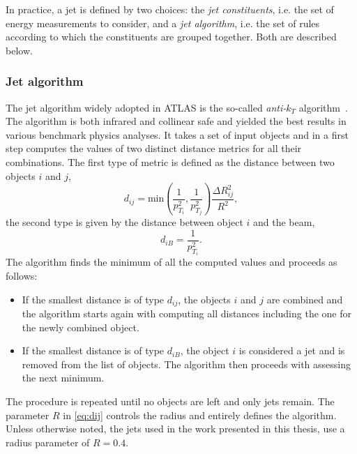 In practice, a jet is defined by two choices: the \emph{jet constituents}, i.e. the set of energy measurements to consider, and a \emph{jet algorithm}, i.e. the set of rules according to which the constituents are grouped together.
Both are described below.



\subsubsection{Jet algorithm}
The jet algorithm widely adopted in ATLAS is the so-called \emph{anti-$k_T$} algorithm~\cite{Cacciari:2008gp}. The algorithm is both infrared and collinear safe and yielded the best results in various benchmark physics analyses. 
It takes a set of input objects and in a first step computes the values of two distinct distance metrics for all their combinations.
The first type of metric is defined as the distance between two objects $i$ and $j$,
\begin{equation}
    d_{ij} = \text{min}\left(\frac{1}{p_{T_i}^2},\frac{1}{p_{T_j}^2}\right) \frac{\Delta R_{ij}^2}{R^2},
    \label{eq:dij}
\end{equation}
the second type is given by the distance between object $i$ and the beam,
\begin{equation}
    d_{iB} = \frac{1}{p_{T_i}^2}.
\end{equation}
The algorithm finds the minimum of all the computed values and proceeds as follows:
\begin{itemize}
    \item If the smallest distance is of type $d_{ij}$, the objects $i$ and $j$ are combined and the algorithm starts again with computing all distances including the one for the newly combined object.
    \item If the smallest distance is of type $d_{iB}$, the object $i$ is considered a jet and is removed from the list of objects. The algorithm then proceeds with assessing the next minimum.
\end{itemize}
The procedure is repeated until no objects are left and only jets remain.
The parameter $R$ in \cref{eq:dij} controls the radius and entirely defines the algorithm.
Unless otherwise noted, the jets used in the work presented in this thesis, use a radius parameter of $R = 0.4$.

